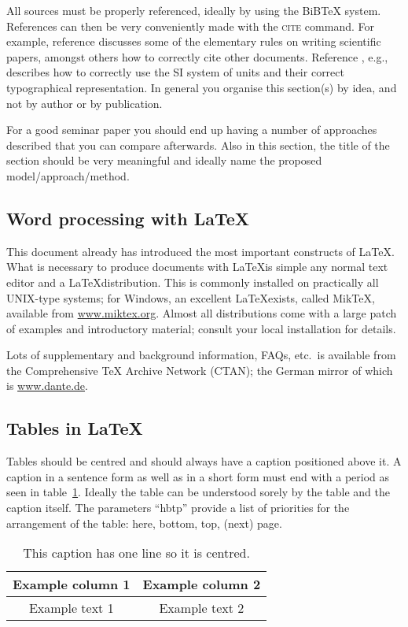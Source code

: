 \documentclass[12pt,twoside]{article}
\theoremstyle{plain}
\theoremstyle{definition}
\theoremstyle{remark}
\begin{document}
All sources must be properly referenced, ideally by using the BiBTeX system. References can then be very conveniently made with the \textsc{cite} command. For example, reference
\cite{Leunen:Scholars:92} discusses some of the elementary rules on writing scientific papers, amongst others how to correctly cite other documents. Reference \cite{Taylor:SIGuide:95}, e.g., describes how to correctly use the SI system of units and their correct typographical
representation. In general you organise this section(s) by idea, and not by author or by publication.

For a good seminar paper you should end up having a number of approaches described that you can compare afterwards. Also in this section, the title of the section should be very meaningful and ideally name the proposed model/approach/method.

\subsection{Word processing with \LaTeX}
\label{sec:model:subsec:latex}

This document already has introduced the most important constructs of \LaTeX. What is necessary to produce documents with \LaTeX is simple any normal text editor and a \LaTeX distribution. This is commonly installed on practically all UNIX-type systems; for Windows, an
excellent \LaTeX exists, called MikTeX, available from \url{www.miktex.org}. Almost all distributions come with a large patch of examples and introductory material; consult your local installation for details. 

Lots of supplementary and background information, FAQs, etc.\ is available from the Comprehensive TeX Archive Network (CTAN); the German mirror of which is \url{www.dante.de}. 

\subsection{Tables in \LaTeX}
\label{sec:model:subsec:tables}
Tables should be centred and should always have a caption positioned above it. A caption in a sentence form as well as in a short form must end with a period as seen in table~\ref{tab:sample}. Ideally the table can be understood sorely by the table and the caption itself. The parameters ``hbtp'' provide a list of priorities for the arrangement of the table: here, bottom, top, (next) page.

\begin{table}[hbtp] 
  \caption{This caption has one line so it is centred.}\label{tab:sample} 
  \centering
  \begin{tabular}{|c|c|}
    \hline
    Example column 1 & Example column 2 \\
    \hline
    Example text 1 & Example text 2 \\
    \hline
  \end{tabular}
\end{table}
\end{document}

